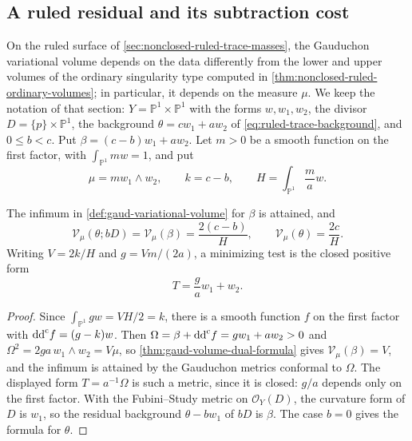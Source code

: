 \subsection{A ruled residual and its subtraction cost}
\label{subsec:ruled-residual-gauduchon-cost}

On the ruled surface of \cref{sec:nonclosed-ruled-trace-masses}, the Gauduchon variational volume depends on the data differently from the lower and upper volumes of the ordinary singularity type computed in \cref{thm:nonclosed-ruled-ordinary-volumes}; in particular, it depends on the measure $\mu$. We keep the notation of that section: $Y=\mathbb P^1\times\mathbb P^1$ with the forms $w,w_1,w_2$, the divisor $D=\{p\}\times\mathbb P^1$, the background $\theta=cw_1+aw_2$ of \eqref{eq:ruled-trace-background}, and $0\leq b<c$. Put $\beta=(c-b)w_1+aw_2$. Let $m>0$ be a smooth function on the first factor, with $\int_{\mathbb P^1}mw=1$, and put
\[
 \mu=mw_1\wedge w_2,\qquad k=c-b,\qquad H=\int_{\mathbb P^1}\frac{m}{a}w.
\]

\enlargethispage{4\baselineskip}
\begin{proposition}\label{prop:ruled-residual-gauduchon-volume}
The infimum in \cref{def:gaud-variational-volume} for $\beta$ is attained, and
\begin{equation}\label{eq:ruled-residual-gauduchon-volume}
 \mathcal V_\mu(\theta;bD)=\mathcal V_\mu(\beta)=\frac{2(c-b)}{H},
 \qquad \mathcal V_\mu(\theta)=\frac{2c}{H}.
\end{equation}
Writing $V=2k/H$ and $g=Vm/(2a)$, a minimizing test is the closed positive form
\[
 T=\frac ga w_1+w_2.
\]
\end{proposition}
\begin{proof}
Since $\int_{\mathbb P^1}gw=VH/2=k$, there is a smooth function $f$ on the first factor with $\mathrm{dd}^{\mathrm{c}} f=(g-k)w$. Then $\Omega=\beta+\mathrm{dd}^{\mathrm{c}} f=gw_1+aw_2>0$ and $\Omega^2=2ga\,w_1\wedge w_2=V\mu$, so \cref{thm:gaud-volume-dual-formula} gives $\mathcal V_\mu(\beta)=V$, and the infimum is attained by the Gauduchon metrics conformal to $\Omega$. The displayed form $T=a^{-1}\Omega$ is such a metric, since it is closed: $g/a$ depends only on the first factor. With the Fubini--Study metric on $\mathcal O_Y(D)$, the curvature form of $D$ is $w_1$, so the residual background $\theta-b w_1$ of $bD$ is $\beta$. The case $b=0$ gives the formula for $\theta$.
\end{proof}

